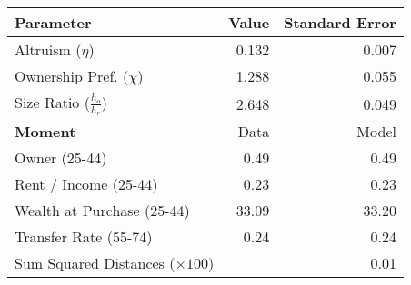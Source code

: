 \begin{tabular}{lrr}
\toprule   
 \textbf{Parameter} & Value & Standard Error\\
\midrule
Altruism ($\eta$) & 0.132 & 0.007\\
Ownership Pref. ($\chi$) & 1.288 & 0.055\\
Size Ratio ($\frac{h_o}{h_r}$) & 2.648 & 0.049\\
\cmidrule(lr){1-3} 

 
\textbf{Moment} & Data & Model\\
\midrule
Owner (25-44) & 0.49 & 0.49\\
Rent / Income (25-44) & 0.23 & 0.23\\
Wealth at Purchase (25-44) & 33.09 & 33.20\\
Transfer Rate (55-74) & 0.24 & 0.24\\
\midrule 
 Sum Squared Distances ($ \times 100$) &  & 0.01\\
\bottomrule
\end{tabular}
